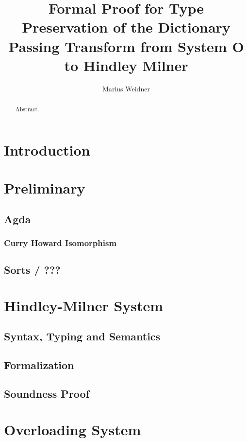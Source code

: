 \documentclass[runningheads]{llncs}
\begin{document}
\title{Formal Proof for Type Preservation of the Dictionary Passing Transform from System O to Hindley Milner}
\author{Marius Weidner}
\maketitle

\begin{abstract}
  Abstract.
\end{abstract}

\section{Introduction}
\section{Preliminary}
\subsection{Agda}
\subsubsection{Curry Howard Isomorphism}
\subsection{Sorts / ???}
\subsection{}
\section{Hindley-Milner System}
\subsection{Syntax, Typing and Semantics}
\subsection{Formalization}
\subsection{Soundness Proof}
\section{Overloading System}
\end{document}
